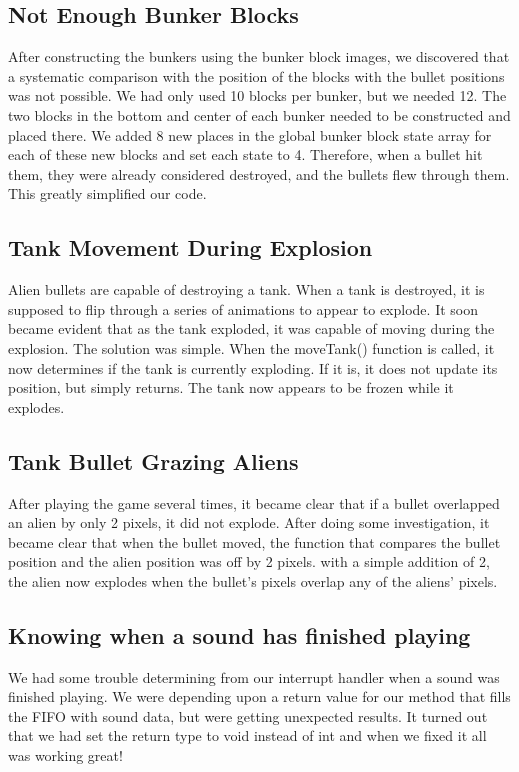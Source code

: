 \documentclass[11pt,letter,oneside]{report}
\begin{document}
\subsection{Not Enough Bunker Blocks}
After constructing the bunkers using the bunker block images, we discovered that a systematic comparison with the position of the blocks with the bullet positions was not possible. We had only used 10 blocks per bunker, but we needed 12. The two blocks in the bottom and center of each bunker needed to be constructed and placed there. We added 8 new places in the global bunker block state array for each of these new blocks and set each state to 4. Therefore, when a bullet hit them, they were already considered destroyed, and the bullets flew through them. This greatly simplified our code.

\subsection{Tank Movement During Explosion}
Alien bullets are capable of destroying a tank. When a tank is destroyed, it is supposed to flip through a series of animations to appear to explode. It soon became evident that as the tank exploded, it was capable of moving during the explosion. The solution was simple. When the moveTank() function is called, it now determines if the tank is currently exploding. If it is, it does not update its position, but simply returns. The tank now appears to be frozen while it explodes.

\subsection{Tank Bullet Grazing Aliens}
After playing the game several times, it became clear that if a bullet overlapped an alien by only 2 pixels, it did not explode. After doing some investigation, it became clear that when the bullet moved, the function that compares the bullet position and the alien position was off by 2 pixels. with a simple addition of 2, the alien now explodes when the bullet's pixels overlap any of the aliens' pixels.

\subsection{Knowing when a sound has finished playing}
We had some trouble determining from our interrupt handler when a sound was finished playing.  We were depending upon a return value for our method that fills the FIFO with sound data, but were getting unexpected results.  It turned out that we had set the return type to void instead of int and when we fixed it all was working great!
\end{document}
